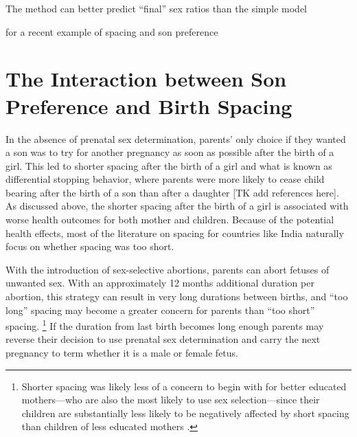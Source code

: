 \documentclass[12pt,letterpaper]{article}
\begin{document}
The method can better predict ``final'' sex ratios than the simple model


\citep{Soest2012} for a recent example of spacing and son preference


\section{The Interaction between Son Preference and Birth Spacing\label{sec:model}}

In the absence of prenatal sex determination, parents' only choice if they 
wanted a son was to try for another pregnancy as soon as possible after
the birth of a girl. 
This led to shorter spacing after the birth of a girl and what
is known as differential stopping behavior, where parents were 
more likely to cease child bearing after the birth of a son than
after a daughter [TK add references here]. 
As discussed above, the shorter spacing after the birth of a girl is 
associated with worse health outcomes for both mother and children.
Because of the potential health effects, most of the literature on spacing 
for countries like India naturally focus on whether spacing was too short.

With the introduction of sex-selective abortions, parents can abort
fetuses of unwanted sex.
With an approximately 12 months additional duration per abortion,
this strategy can result in very long durations between births, and
``too long'' spacing may become a greater concern for parents than 
``too short'' spacing.%
\footnote{
Shorter spacing was likely less of a concern to begin with for
better educated mothers---who are also the most likely to use 
sex selection---since their children are substantially less likely 
to be negatively affected by short spacing than children of less 
educated mothers \citep{Whitworth2002}.
}
If the duration from last birth becomes long enough parents may 
reverse their decision to use prenatal sex determination
and carry the next pregnancy to term whether it is a male or female fetus.
\end{document}
